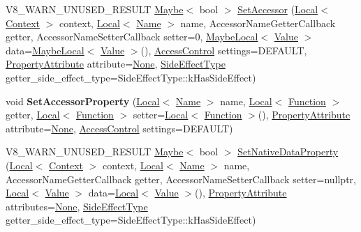 \begin{DoxyCompactItemize}
V8\+\_\+\+W\+A\+R\+N\+\_\+\+U\+N\+U\+S\+E\+D\+\_\+\+R\+E\+S\+U\+LT \mbox{\hyperlink{classv8_1_1Maybe}{Maybe}}$<$ bool $>$ \mbox{\hyperlink{classv8_1_1Object_a8b3bc74f5b4f5b5fc87560d0548274ed}{Set\+Accessor}} (\mbox{\hyperlink{classv8_1_1Local}{Local}}$<$ \mbox{\hyperlink{classv8_1_1Context}{Context}} $>$ context, \mbox{\hyperlink{classv8_1_1Local}{Local}}$<$ \mbox{\hyperlink{classv8_1_1Name}{Name}} $>$ name, Accessor\+Name\+Getter\+Callback getter, Accessor\+Name\+Setter\+Callback setter=0, \mbox{\hyperlink{classv8_1_1MaybeLocal}{Maybe\+Local}}$<$ \mbox{\hyperlink{classv8_1_1Value}{Value}} $>$ data=\mbox{\hyperlink{classv8_1_1MaybeLocal}{Maybe\+Local}}$<$ \mbox{\hyperlink{classv8_1_1Value}{Value}} $>$(), \mbox{\hyperlink{namespacev8_a31d8355cb043d7d2dda3f4a52760b64e}{Access\+Control}} settings=D\+E\+F\+A\+U\+LT, \mbox{\hyperlink{namespacev8_a05f25f935e108a1ea2d150e274602b87}{Property\+Attribute}} attribute=\mbox{\hyperlink{namespacev8_a05f25f935e108a1ea2d150e274602b87a7ab4d58719c33b3ea2dfaefa29b111df}{None}}, \mbox{\hyperlink{namespacev8_a29711319c2b9fc7716d65faee2f7b9cb}{Side\+Effect\+Type}} getter\+\_\+side\+\_\+effect\+\_\+type=Side\+Effect\+Type\+::k\+Has\+Side\+Effect)
\item 
\mbox{\label{classv8_1_1Object_a284911d760fc853d81adf98c242bc453}} 
void {\bfseries Set\+Accessor\+Property} (\mbox{\hyperlink{classv8_1_1Local}{Local}}$<$ \mbox{\hyperlink{classv8_1_1Name}{Name}} $>$ name, \mbox{\hyperlink{classv8_1_1Local}{Local}}$<$ \mbox{\hyperlink{classv8_1_1Function}{Function}} $>$ getter, \mbox{\hyperlink{classv8_1_1Local}{Local}}$<$ \mbox{\hyperlink{classv8_1_1Function}{Function}} $>$ setter=\mbox{\hyperlink{classv8_1_1Local}{Local}}$<$ \mbox{\hyperlink{classv8_1_1Function}{Function}} $>$(), \mbox{\hyperlink{namespacev8_a05f25f935e108a1ea2d150e274602b87}{Property\+Attribute}} attribute=\mbox{\hyperlink{namespacev8_a05f25f935e108a1ea2d150e274602b87a7ab4d58719c33b3ea2dfaefa29b111df}{None}}, \mbox{\hyperlink{namespacev8_a31d8355cb043d7d2dda3f4a52760b64e}{Access\+Control}} settings=D\+E\+F\+A\+U\+LT)
\item 
V8\+\_\+\+W\+A\+R\+N\+\_\+\+U\+N\+U\+S\+E\+D\+\_\+\+R\+E\+S\+U\+LT \mbox{\hyperlink{classv8_1_1Maybe}{Maybe}}$<$ bool $>$ \mbox{\hyperlink{classv8_1_1Object_a4496e25c9bb20a3181c603040029a7fc}{Set\+Native\+Data\+Property}} (\mbox{\hyperlink{classv8_1_1Local}{Local}}$<$ \mbox{\hyperlink{classv8_1_1Context}{Context}} $>$ context, \mbox{\hyperlink{classv8_1_1Local}{Local}}$<$ \mbox{\hyperlink{classv8_1_1Name}{Name}} $>$ name, Accessor\+Name\+Getter\+Callback getter, Accessor\+Name\+Setter\+Callback setter=nullptr, \mbox{\hyperlink{classv8_1_1Local}{Local}}$<$ \mbox{\hyperlink{classv8_1_1Value}{Value}} $>$ data=\mbox{\hyperlink{classv8_1_1Local}{Local}}$<$ \mbox{\hyperlink{classv8_1_1Value}{Value}} $>$(), \mbox{\hyperlink{namespacev8_a05f25f935e108a1ea2d150e274602b87}{Property\+Attribute}} attributes=\mbox{\hyperlink{namespacev8_a05f25f935e108a1ea2d150e274602b87a7ab4d58719c33b3ea2dfaefa29b111df}{None}}, \mbox{\hyperlink{namespacev8_a29711319c2b9fc7716d65faee2f7b9cb}{Side\+Effect\+Type}} getter\+\_\+side\+\_\+effect\+\_\+type=Side\+Effect\+Type\+::k\+Has\+Side\+Effect)

\end{DoxyCompactItemize}
